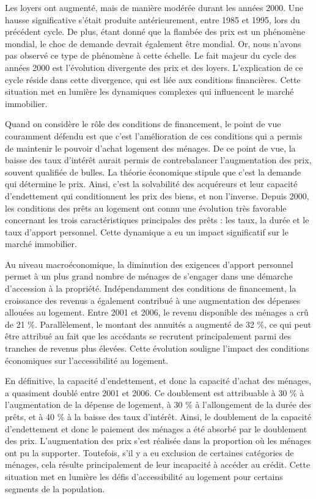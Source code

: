 \documentclass[a4paper, 12pt]{report}
\begin{document}
Les loyers ont augmenté, mais de manière modérée durant les années 2000. Une hausse significative s'était produite antérieurement, entre 1985 et 1995, lors du précédent cycle. De plus, étant donné que la flambée des prix est un phénomène mondial, le choc de demande devrait également être mondial. Or, nous n'avons pas observé ce type de phénomène à cette échelle. Le fait majeur du cycle des années 2000 est l'évolution divergente des prix et des loyers. L'explication de ce cycle réside dans cette divergence, qui est liée aux conditions financières. Cette situation met en lumière les dynamiques complexes qui influencent le marché immobilier.

Quand on considère le rôle des conditions de financement, le point de vue couramment défendu est que c'est l'amélioration de ces conditions qui a permis de maintenir le pouvoir d'achat logement des ménages. De ce point de vue, la baisse des taux d'intérêt aurait permis de contrebalancer l'augmentation des prix, souvent qualifiée de bulles. La théorie économique stipule que c'est la demande qui détermine le prix. Ainsi, c'est la solvabilité des acquéreurs et leur capacité d'endettement qui conditionnent les prix des biens, et non l'inverse. Depuis 2000, les conditions des prêts au logement ont connu une évolution très favorable concernant les trois caractéristiques principales des prêts : les taux, la durée et le taux d'apport personnel. Cette dynamique a eu un impact significatif sur le marché immobilier.

Au niveau macroéconomique, la diminution des exigences d'apport personnel permet à un plus grand nombre de ménages de s'engager dans une démarche d'accession à la propriété. Indépendamment des conditions de financement, la croissance des revenus a également contribué à une augmentation des dépenses allouées au logement. Entre 2001 et 2006, le revenu disponible des ménages a crû de 21 \%. Parallèlement, le montant des annuités a augmenté de 32 \%, ce qui peut être attribué au fait que les accédants se recrutent principalement parmi des tranches de revenus plus élevées. Cette évolution souligne l'impact des conditions économiques sur l'accessibilité au logement.


En définitive, la capacité d'endettement, et donc la capacité d'achat des ménages, a quasiment doublé entre 2001 et 2006. Ce doublement est attribuable à 30 \% à l'augmentation de la dépense de logement, à 30 \% à l'allongement de la durée des prêts, et à 40 \% à la baisse des taux d'intérêt. Ainsi, le doublement de la capacité d'endettement et donc le paiement des ménages a été absorbé par le doublement des prix. L'augmentation des prix s'est réalisée dans la proportion où les ménages ont pu la supporter. Toutefois, s'il y a eu exclusion de certaines catégories de ménages, cela résulte principalement de leur incapacité à accéder au crédit. Cette situation met en lumière les défis d'accessibilité au logement pour certains segments de la population.
\end{document}
